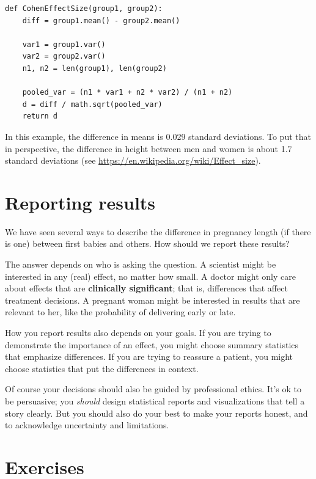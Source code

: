 \documentclass[12pt]{book}
\begin{document}
\begin{verbatim}
def CohenEffectSize(group1, group2):
    diff = group1.mean() - group2.mean()

    var1 = group1.var()
    var2 = group2.var()
    n1, n2 = len(group1), len(group2)

    pooled_var = (n1 * var1 + n2 * var2) / (n1 + n2)
    d = diff / math.sqrt(pooled_var)
    return d
\end{verbatim}

In this example, the difference in means is 0.029 standard deviations.
To put that in perspective, the difference in height between men and
women is about 1.7 standard deviations (see
\url{https://en.wikipedia.org/wiki/Effect_size}).


\section{Reporting results}

We have seen several ways to describe the difference in pregnancy
length (if there is one) between first babies and others.  How should
we report these results?

The answer depends on who is asking the question.  A scientist might
be interested in any (real) effect, no matter how small.  A doctor
might only care about effects that are {\bf clinically significant};
that is, differences that affect treatment decisions.  A pregnant
woman might be interested in results that are relevant to her, like
the probability of delivering early or late.   

How you report results also depends on your goals.  If you are trying
to demonstrate the importance of an effect, you might choose summary
statistics that emphasize differences.  If you are trying to reassure
a patient, you might choose statistics that put the differences in
context.

Of course your decisions should also be guided by professional ethics.
It's ok to be persuasive; you {\em should} design statistical reports
and visualizations that tell a story clearly.  But you should also do
your best to make your reports honest, and to acknowledge uncertainty
and limitations.


\section{Exercises}
\end{document}
